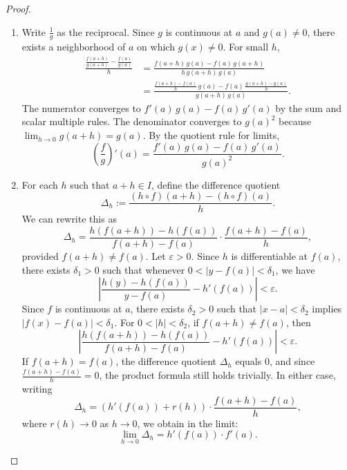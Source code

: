 \begin{proof}
\begin{enumerate}
        \item Write $\frac{1}{g}$ as the reciprocal. Since $g$ is continuous at $a$ and $g(a) \neq 0$, there exists a neighborhood of $a$ on which $g(x) \neq 0$. For small $h$,
            \begin{align*}
                \frac{\frac{f(a+h)}{g(a+h)} - \frac{f(a)}{g(a)}}{h} &= \frac{f(a+h)\,g(a) - f(a)\,g(a+h)}{h\,g(a+h)\,g(a)} \\
                &= \frac{\frac{f(a+h) - f(a)}{h}\,g(a) - f(a)\,\frac{g(a+h) - g(a)}{h}}{g(a+h)\,g(a)}.
            \end{align*}
            The numerator converges to $f'(a)\,g(a) - f(a)\,g'(a)$ by the sum and scalar multiple rules. The denominator converges to $g(a)^2$ because $\lim_{h \to 0} g(a+h) = g(a)$. By the quotient rule for limits,
            $$\left(\frac{f}{g}\right)'(a) = \frac{f'(a)\,g(a) - f(a)\,g'(a)}{g(a)^2}.$$

        \item For each $h$ such that $a+h \in I$, define the difference quotient
            $$\Delta_h := \frac{(h \circ f)(a+h) - (h \circ f)(a)}{h}.$$
            We can rewrite this as
            $$\Delta_h = \frac{h(f(a+h)) - h(f(a))}{f(a+h) - f(a)} \cdot \frac{f(a+h) - f(a)}{h},$$
            provided $f(a+h) \neq f(a)$. Let $\varepsilon > 0$. Since $h$ is differentiable at $f(a)$, there exists $\delta_1 > 0$ such that whenever $0 < |y - f(a)| < \delta_1$, we have
            $$\left| \frac{h(y) - h(f(a))}{y - f(a)} - h'(f(a)) \right| < \varepsilon.$$
            Since $f$ is continuous at $a$, there exists $\delta_2 > 0$ such that $|x - a| < \delta_2$ implies $|f(x) - f(a)| < \delta_1$. For $0 < |h| < \delta_2$, if $f(a+h) \neq f(a)$, then
            $$\left| \frac{h(f(a+h)) - h(f(a))}{f(a+h) - f(a)} - h'(f(a)) \right| < \varepsilon.$$
            If $f(a+h) = f(a)$, the difference quotient $\Delta_h$ equals $0$, and since $\frac{f(a+h)-f(a)}{h} = 0$, the product formula still holds trivially. In either case, writing
            $$\Delta_h = \left( h'(f(a)) + r(h) \right) \cdot \frac{f(a+h) - f(a)}{h},$$
            where $r(h) \to 0$ as $h \to 0$, we obtain in the limit:
            $$\lim_{h \to 0} \Delta_h = h'(f(a)) \cdot f'(a).$$
    \end{enumerate}
\end{proof}
